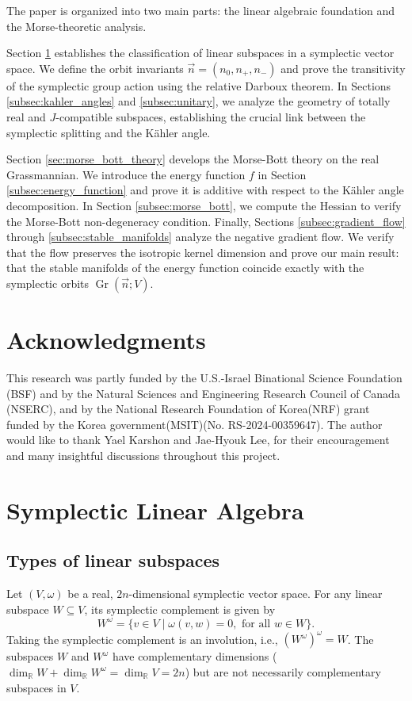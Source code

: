\documentclass[12pt, final]{article}
\def\R{\mathbb{R}}
\def\Gr{\operatorname{Gr}}
\begin{document}
The paper is organized into two main parts: the linear algebraic foundation and the Morse-theoretic analysis.

Section \ref{sec:symplectic_linear_algebra} establishes the classification of linear subspaces in a symplectic vector space. We define the orbit invariants $\vec{n} = (n_0, n_+, n_-)$ and prove the transitivity of the symplectic group action using the relative Darboux theorem. In Sections \ref{subsec:kahler_angles} and \ref{subsec:unitary}, we analyze the geometry of totally real and $J$-compatible subspaces, establishing the crucial link between the symplectic splitting and the K\"{a}hler angle.

Section \ref{sec:morse_bott_theory} develops the Morse-Bott theory on the real Grassmannian. We introduce the energy function $f$ in Section \ref{subsec:energy_function} and prove it is additive with respect to the K\"{a}hler angle decomposition. In Section \ref{subsec:morse_bott}, we compute the Hessian to verify the Morse-Bott non-degeneracy condition. Finally, Sections \ref{subsec:gradient_flow} through \ref{subsec:stable_manifolds} analyze the negative gradient flow. We verify that the flow preserves the isotropic kernel dimension and prove our main result: that the stable manifolds of the energy function coincide exactly with the symplectic orbits $\Gr(\vec{n}; V)$.

\section*{Acknowledgments}
This research was partly funded by the U.S.-Israel Binational Science Foundation (BSF) and by the Natural Sciences and Engineering Research Council of Canada (NSERC), and by the National Research Foundation of Korea(NRF) grant funded by the Korea government(MSIT)(No. RS-2024-00359647). The author would like to thank Yael Karshon and Jae-Hyouk Lee, for their encouragement and many insightful discussions throughout this project.

\section{Symplectic Linear Algebra} \label{sec:symplectic_linear_algebra}
\subsection{Types of linear subspaces}\label{subsec:types}
Let $(V, \omega)$ be a real, $2n$-dimensional symplectic vector space. For any linear subspace $W \subseteq V$, its symplectic complement is given by
\begin{equation} \label{eq:symplectic_complement}
W^\omega = \{ v \in V \mid \omega(v, w) = 0, \text{ for all } w \in W \}.\end{equation} Taking the symplectic complement is an involution, i.e., $(W^\omega)^\omega = W$. The subspaces $W$ and $W^\omega$ have complementary dimensions ($\dim_\R W + \dim_\R W^\omega = \dim_\R V = 2n$) but are not necessarily complementary subspaces in $V$.
\end{document}

